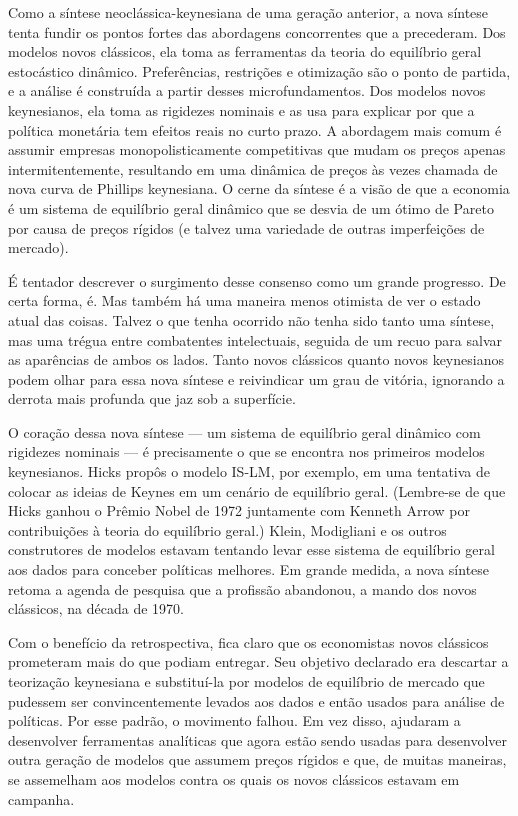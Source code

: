 \documentclass[12pt]{article}
\begin{document}
Como a síntese neoclássica-keynesiana de uma geração anterior, a nova síntese tenta fundir os pontos fortes das abordagens concorrentes que a precederam. Dos modelos novos clássicos, ela toma as ferramentas da teoria do equilíbrio geral estocástico dinâmico. Preferências, restrições e otimização são o ponto de partida, e a análise é construída a partir desses microfundamentos. Dos modelos novos keynesianos, ela toma as rigidezes nominais e as usa para explicar por que a política monetária tem efeitos reais no curto prazo. A abordagem mais comum é assumir empresas monopolisticamente competitivas que mudam os preços apenas intermitentemente, resultando em uma dinâmica de preços às vezes chamada de nova curva de Phillips keynesiana. O cerne da síntese é a visão de que a economia é um sistema de equilíbrio geral dinâmico que se desvia de um ótimo de Pareto por causa de preços rígidos (e talvez uma variedade de outras imperfeições de mercado).

É tentador descrever o surgimento desse consenso como um grande progresso. De certa forma, é. Mas também há uma maneira menos otimista de ver o estado atual das coisas. Talvez o que tenha ocorrido não tenha sido tanto uma síntese, mas uma trégua entre combatentes intelectuais, seguida de um recuo para salvar as aparências de ambos os lados. Tanto novos clássicos quanto novos keynesianos podem olhar para essa nova síntese e reivindicar um grau de vitória, ignorando a derrota mais profunda que jaz sob a superfície.

O coração dessa nova síntese — um sistema de equilíbrio geral dinâmico com rigidezes nominais — é precisamente o que se encontra nos primeiros modelos keynesianos. Hicks propôs o modelo IS-LM, por exemplo, em uma tentativa de colocar as ideias de Keynes em um cenário de equilíbrio geral. (Lembre-se de que Hicks ganhou o Prêmio Nobel de 1972 juntamente com Kenneth Arrow por contribuições à teoria do equilíbrio geral.) Klein, Modigliani e os outros construtores de modelos estavam tentando levar esse sistema de equilíbrio geral aos dados para conceber políticas melhores. Em grande medida, a nova síntese retoma a agenda de pesquisa que a profissão abandonou, a mando dos novos clássicos, na década de 1970.

Com o benefício da retrospectiva, fica claro que os economistas novos clássicos prometeram mais do que podiam entregar. Seu objetivo declarado era descartar a teorização keynesiana e substituí-la por modelos de equilíbrio de mercado que pudessem ser convincentemente levados aos dados e então usados para análise de políticas. Por esse padrão, o movimento falhou. Em vez disso, ajudaram a desenvolver ferramentas analíticas que agora estão sendo usadas para desenvolver outra geração de modelos que assumem preços rígidos e que, de muitas maneiras, se assemelham aos modelos contra os quais os novos clássicos estavam em campanha.
\end{document}
